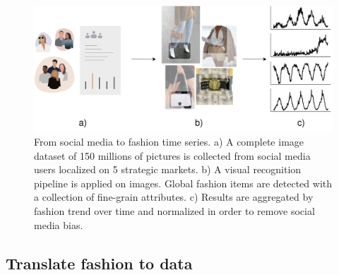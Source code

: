 \documentclass[10pt]{article} %
\begin{document}
\begin{figure}
  \centering
    \includegraphics[width=1.\linewidth]{pipeline_archi}
  \caption{From social media to fashion time series. a) A complete image dataset of 150 millions of pictures is collected from social media users localized on 5 strategic markets. b) A visual recognition pipeline is applied on images. Global fashion items are detected with a collection of fine-grain attributes. c) Results are aggregated by fashion trend over time and normalized in order to remove social media bias. }
\label{fig:pipeline}
\end{figure}

\subsection{Translate fashion to data}
\label{sec:dataset:a}
\end{document}
